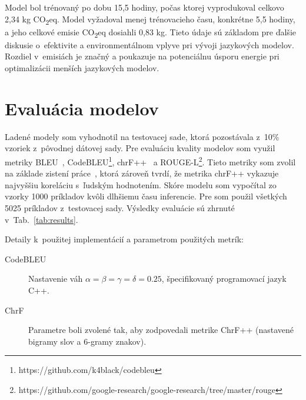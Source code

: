 Model \MC{} bol trénovaný po dobu 15,5 hodiny, počas ktorej vyprodukoval celkovo 2,34 kg CO\textsubscript{2}eq. Model \MCfim{} vyžadoval menej trénovacieho času, konkrétne 5,5 hodiny, a jeho celkové emisie CO\textsubscript{2}eq dosiahli 0,83 kg. Tieto údaje sú základom pre ďalšie diskusie o~efektivite a environmentálnom vplyve pri vývoji jazykových modelov. Rozdiel v~emisiách je značný a poukazuje na potenciálnu úsporu energie pri optimalizácii menších jazykových modelov.

\section{Evaluácia modelov}\label{sec:evaluation}

Ladené modely som vyhodnotil na testovacej sade, ktorá pozostávala z~10\% vzoriek z~pôvodnej dátovej sady. Pre evaluáciu kvality modelov som využil metriky BLEU~\cite{post-2018-call}, CodeBLEU\footnote{https://github.com/k4black/codebleu}, chrF{++}~\cite{post-2018-call} a  ROUGE-L\footnote{https://github.com/google-research/google-research/tree/master/rouge}. Tieto metriky som zvolil na základe zistení práce~\cite{evtikhiev2020out}, ktorá zároveň tvrdí, že metrika chrF{++} vykazuje najvyššiu koreláciu s~ľudským hodnotením. Skóre modelu \MC{} som vypočítal zo vzorky 1000 príkladov kvôli dlhšiemu času inferencie. Pre \MCfim{} som použil všetkých 5025 príkladov z~testovacej sady. Výsledky evaluácie sú zhrnuté v~Tab.~\ref{tab:results}.

\noindent Detaily k~použitej implementácií a parametrom použitých metrík:
\begin{description}
    \item[CodeBLEU]  Nastavenie váh $\alpha =\beta = \gamma =\delta = 0.25$, špecifikovaný programovací jazyk C++.
    \item[ChrF] Parametre boli zvolené tak, aby zodpovedali metrike ChrF++ (nastavené bigramy slov a 6-gramy znakov).
\end{description}

